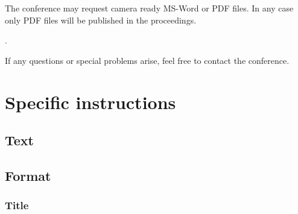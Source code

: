 \documentclass[12pt]{article}
\renewcommand{\_}{\kern-1.5pt\textunderscore\kern-1.5pt}
\begin{document}
\bigskip
The conference may request camera ready MS-Word or PDF files. In any case only PDF files will be published in the proceedings.

.

If any questions or special problems arise, feel free to contact the conference.

\section{Specific instructions}

\subsection{Text}

\subsection{Format}

\subsubsection{Title}

\printbibliography
\end{document}

